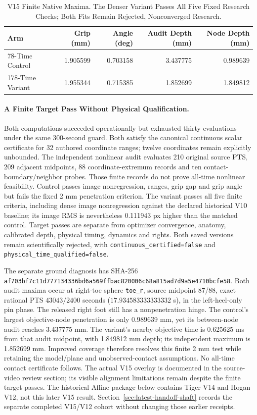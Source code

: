 \documentclass[11pt,letterpaper]{article}
\newcommand{\code}[1]{\nolinkurl{#1}}
\newcommand{\hash}[1]{{\footnotesize\nolinkurl{#1}}}
\begin{document}
\begin{table}[htbp]
\centering\small
\begin{tabular}{@{}lrrrr@{}}
\toprule Arm & Grip (mm) & Angle (deg) & Audit Depth (mm) & Node Depth (mm)\\\midrule
78-Time Control & 1.905599 & 0.703158 & 3.437775 & 0.989639\\
178-Time Variant & 1.955344 & 0.715385 & 1.852699 & 1.849812\\
\bottomrule
\end{tabular}
\caption{V15 Finite Native Maxima. The Denser Variant Passes All Five Fixed
Research Checks; Both Fits Remain Rejected, Nonconverged Research.}
\end{table}

\paragraph{A Finite Target Pass Without Physical Qualification.}
Both computations succeeded operationally but exhausted thirty evaluations
under the same 300-second guard. Both satisfy the canonical continuous scalar
certificate for 32 authored coordinate ranges; twelve coordinates remain
explicitly unbounded. The independent nonlinear audit evaluates 210 original
source PTS, 209 adjacent midpoints, 88 coordinate-extremum records and ten
contact-boundary/neighbor probes. Those finite records do not prove all-time
nonlinear feasibility. Control passes image nonregression, ranges, grip gap
and grip angle but fails the fixed 2 mm penetration criterion. The variant
passes all five finite criteria, including dense image nonregression against
the declared historical V10 baseline; its image RMS is nevertheless 0.111943 px
higher than the matched control. Target passes are separate from optimizer
convergence, anatomy, calibrated depth, physical timing, dynamics and rights.
Both saved versions remain scientifically rejected, with
\code{continuous\_certified=false} and \code{physical\_time\_qualified=false}.

The separate ground diagnosis has SHA-256
\hash{af703bf7c11d777134336bd6a569ffbac820006c68a815ad7d9a5e4710bcfe58}.
Both audit maxima occur at right-toe sphere \code{toe\_r}, source midpoint
87/88, exact rational PTS $43043/2400$ seconds
($17.934583333333332$ s), in the left-heel-only pin phase. The released right
foot still has a nonpenetration hinge. The control's largest objective-node
penetration is only 0.989639 mm, yet its between-node audit reaches 3.437775 mm.
The variant's nearby objective time is 0.625625 ms from that audit midpoint,
with 1.849812 mm depth; its independent maximum is 1.852699 mm. Improved coverage
therefore resolves this finite 2 mm test while retaining the model/plane and
unobserved-contact assumptions. No all-time contact certificate follows.
The actual V15 overlay is documented in the source-video review section; its
visible alignment limitations remain despite the finite target passes. The
historical Affine package below contains Tiger V14 and Hogan V12, not this
later V15 result. Section~\ref{sec:latest-handoff-shaft} records the separate
completed V15/V12 cohort without changing those earlier receipts.
\end{document}

